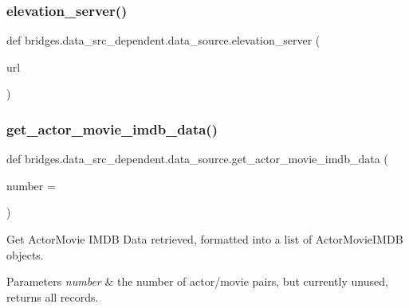 \subsubsection{\texorpdfstring{elevation\+\_\+server()}{elevation\_server()}}
{\footnotesize\ttfamily def bridges.\+data\+\_\+src\+\_\+dependent.\+data\+\_\+source.\+elevation\+\_\+server (\begin{DoxyParamCaption}\item[{}]{url }\end{DoxyParamCaption})}

\mbox{\label{namespacebridges_1_1data__src__dependent_1_1data__source_a5a685fd00b37b99d63e706289dad9063}} 
\subsubsection{\texorpdfstring{get\+\_\+actor\+\_\+movie\+\_\+imdb\+\_\+data()}{get\_actor\_movie\_imdb\_data()}}
{\footnotesize\ttfamily def bridges.\+data\+\_\+src\+\_\+dependent.\+data\+\_\+source.\+get\+\_\+actor\+\_\+movie\+\_\+imdb\+\_\+data (\begin{DoxyParamCaption}\item[{}]{number = {} }\end{DoxyParamCaption})}



Get Actor\+Movie I\+M\+DB Data retrieved, formatted into a list of Actor\+Movie\+I\+M\+DB objects. 


\begin{DoxyParams}{Parameters}
{\em number} & the number of actor/movie pairs, but currently unused, returns all records. \\
\hline
\end{DoxyParams}

